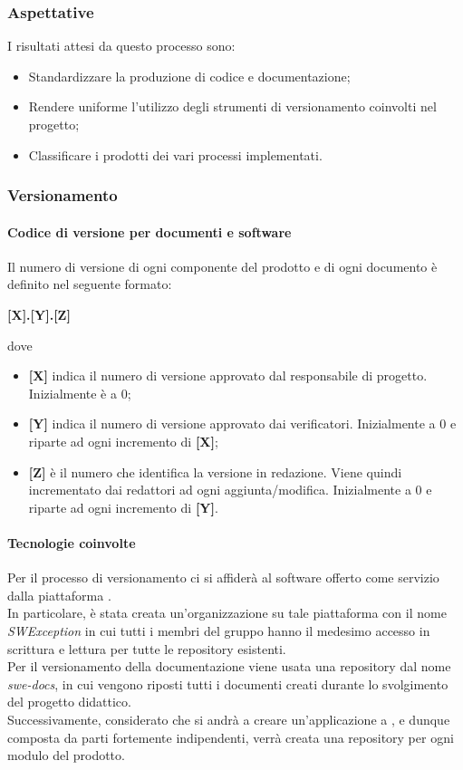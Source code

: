 \subsubsection{Aspettative}
I risultati attesi da questo processo sono:
\begin{itemize}
    \item Standardizzare la produzione di codice e documentazione;
    \item Rendere uniforme l'utilizzo degli strumenti di versionamento coinvolti nel progetto;
    \item Classificare i prodotti dei vari processi implementati.
\end{itemize}

\subsubsection{Versionamento}
\paragraph{Codice di versione per documenti e software}
Il numero di versione di ogni componente del prodotto e di ogni documento è definito nel seguente formato:
\begin{center}
    \textbf{[X].[Y].[Z]}
\end{center}
dove
\begin{itemize}
    \item \textbf{[X]} indica il numero di versione approvato dal responsabile di progetto. Inizialmente è a 0;
    \item \textbf{[Y]} indica il numero di versione approvato dai verificatori. Inizialmente a 0 e riparte ad ogni
                       incremento di \textbf{[X]};
    \item \textbf{[Z]} è il numero che identifica la versione in redazione. Viene quindi incrementato dai redattori
                       ad ogni aggiunta/modifica. Inizialmente a 0 e riparte ad ogni incremento di \textbf{[Y]}.
\end{itemize}

\paragraph{Tecnologie coinvolte}
Per il processo di versionamento ci si affiderà al software  offerto come servizio dalla piattaforma .\\
In particolare, è stata creata un'organizzazione su tale piattaforma con il nome \textit{SWException} in cui tutti i membri del gruppo
hanno il medesimo accesso in scrittura e lettura per tutte le repository esistenti.\\
Per il versionamento della documentazione viene usata una repository dal nome \textit{swe-docs}, in cui vengono riposti tutti i
documenti creati durante lo svolgimento del progetto didattico.\\
Successivamente,  considerato che si andrà a creare un'applicazione a , e dunque composta da parti fortemente indipendenti,
verrà creata una repository per ogni modulo del prodotto.

